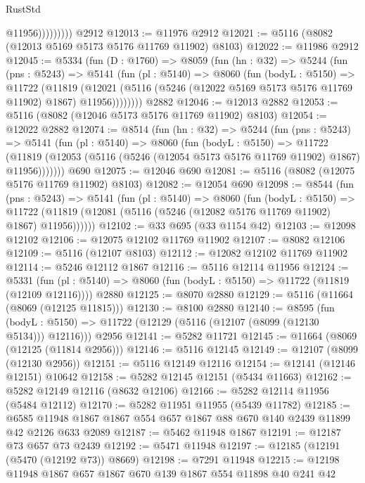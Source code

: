 \begin{lexlean}{RustStd}
\begin{coremodule}
{\begin{coremodule}
{{{{{{{{{{{{{{{{{{{{{{{{{{{{{{{                      @11956)))))))))
    @2912
@12013 := @11976 @2912
@12021 := @5116 (@8082 (@12013 @5169 @5173 @5176 @11769 @11902) @8103)
@12022 := @11986 @2912
@12045 := @5334
    (fun (D : @1760) =>
    @8059
      (fun (hn : @32) =>
      @5244
        (fun (pns : @5243) =>
        @5141
          (fun (pl : @5140) =>
          @8060
            (fun (bodyL : @5150) =>
            @11722
              (@11819
                (@12021 (@5116 (@5246 (@12022 @5169 @5173 @5176 @11769 @11902) @1867) @11956))))))))
    @2882
@12046 := @12013 @2882
@12053 := @5116 (@8082 (@12046 @5173 @5176 @11769 @11902) @8103)
@12054 := @12022 @2882
@12074 := @8514
    (fun (hn : @32) =>
    @5244
      (fun (pns : @5243) =>
      @5141
        (fun (pl : @5140) =>
        @8060
          (fun (bodyL : @5150) =>
          @11722
            (@11819 (@12053 (@5116 (@5246 (@12054 @5173 @5176 @11769 @11902) @1867) @11956)))))))
    @690
@12075 := @12046 @690
@12081 := @5116 (@8082 (@12075 @5176 @11769 @11902) @8103)
@12082 := @12054 @690
@12098 := @8544
    (fun (pns : @5243) =>
    @5141
      (fun (pl : @5140) =>
      @8060
        (fun (bodyL : @5150) =>
        @11722 (@11819 (@12081 (@5116 (@5246 (@12082 @5176 @11769 @11902) @1867) @11956))))))
@12102 := @33 @695 (@33 @1154 @42)
@12103 := @12098 @12102
@12106 := @12075 @12102 @11769 @11902
@12107 := @8082 @12106
@12109 := @5116 (@12107 @8103)
@12112 := @12082 @12102 @11769 @11902
@12114 := @5246 @12112 @1867
@12116 := @5116 @12114 @11956
@12124 := @5331
    (fun (pl : @5140) => @8060 (fun (bodyL : @5150) => @11722 (@11819 (@12109 @12116))))
    @2880
@12125 := @8070 @2880
@12129 := @5116 (@11664 (@8069 (@12125 @11815)))
@12130 := @8100 @2880
@12140 := @8595
    (fun (bodyL : @5150) => @11722 (@12129 (@5116 (@12107 (@8099 (@12130 @5134))) @12116)))
    @2956
@12141 := @5282 @11721
@12145 := @11664 (@8069 (@12125 (@11814 @2956)))
@12146 := @5116 @12145
@12149 := @12107 (@8099 (@12130 @2956))
@12151 := @5116 @12149 @12116
@12154 := @12141 (@12146 @12151) @10642
@12158 := @5282 @12145 @12151 (@5434 @11663)
@12162 := @5282 @12149 @12116 (@8632 @12106)
@12166 := @5282 @12114 @11956 (@5484 @12112)
@12170 := @5282 @11951 @11955 (@5439 @11782)
@12185 := @6585 @11948 @1867 @1867 @554 @657 @1867 @88 @670 @140 @2439 @11899 @42 @2126 @633 @2089
@12187 := @5462 @11948 @1867
@12191 := @12187 @73 @657 @73 @2439
@12192 := @5471 @11948
@12197 := @12185 (@12191 (@5470 (@12192 @73)) @8669)
@12198 := @7291 @11948
@12215 := @12198
    @11948
    @1867
    @657
    @1867
    @670
    @139
    @1867
    @554
    @11898
    @40
    @241
    @42
}}}}}}}}}}}}}}}}}}}}}}}}}}}}}}}
\end{coremodule}}
\end{coremodule}
\end{lexlean}
